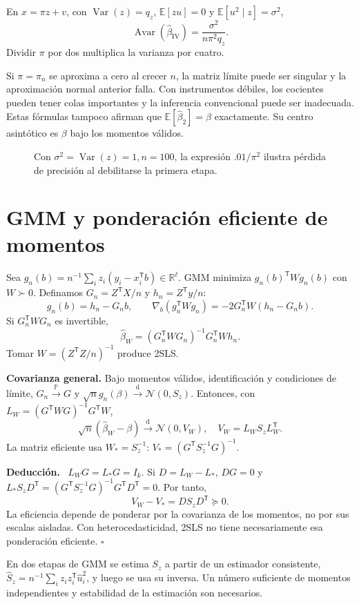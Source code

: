 \documentclass[11pt,a4paper]{article}
\newcommand{\R}{\mathbb R}
\newcommand{\E}{\mathbb E}
\newcommand{\Prob}{\mathbb P}
\newcommand{\T}{^{\mathsf T}}
\DeclareMathOperator{\Var}{Var}
\newcommand{\pto}{\xrightarrow{\Prob}}
\newcommand{\dto}{\xrightarrow{\mathrm d}}
\newcommand{\Normal}{\mathcal N}
\newcommand{\topic}[2]{\clearpage\section{#1}\label{#2}}
\newenvironment{deduccion}{\par\textbf{Deducción.}\ }{\hfill$\square$\par}
\theoremstyle{definition}\newtheorem{definicion}[teorema]{Definición}
\begin{document}
\begin{ejemplo}
En $x=\pi z+v$, con $\Var(z)=q_z$, $\E[zu]=0$ y
$\E[u^2\mid z]=\sigma^2$,
\[
\operatorname{Avar}(\widehat\beta_{\mathrm{IV}})
=\frac{\sigma^2}{n\pi^2q_z}.
\]
Dividir $\pi$ por dos multiplica la varianza por cuatro.
\end{ejemplo}
\begin{cuidado}
Si $\pi=\pi_n$ se aproxima a cero al crecer $n$, la matriz límite puede
ser singular y la aproximación normal anterior falla.
Con instrumentos débiles, los cocientes pueden tener colas importantes
y la inferencia convencional puede ser inadecuada.
Estas fórmulas tampoco afirman que $\E[\widehat\beta_2]=\beta$
exactamente. Su centro asintótico es $\beta$ bajo los momentos válidos.
\end{cuidado}

\begin{figure}[H]\centering
{}
\caption{Con $\sigma^2=\Var(z)=1,n=100$, la expresión $.01/\pi^2$ ilustra pérdida de precisión al debilitarse la primera etapa.}
\end{figure}
\topic{GMM y ponderación eficiente de momentos}{s47}
Sea $g_n(b)=n^{-1}\sum_i z_i(y_i-x_i\T b)\in\R^\ell$.
GMM minimiza $g_n(b)\T Wg_n(b)$ con $W\succ0$.
Definamos $G_n=Z\T X/n$ y $h_n=Z\T y/n$:
\[
g_n(b)=h_n-G_nb,\qquad
\nabla_b(g_n\T Wg_n)=-2G_n\T W(h_n-G_nb).
\]
Si $G_n\T WG_n$ es invertible,
\[
\boxed{\widehat\beta_W=(G_n\T WG_n)^{-1}G_n\T Wh_n}.
\]
Tomar $W=(Z\T Z/n)^{-1}$ produce 2SLS.

\textbf{Covarianza general.}
Bajo momentos válidos, identificación y condiciones de límite,
$G_n\pto G$ y $\sqrt n g_n(\beta)\dto\Normal(0,S_z)$.
Entonces, con $L_W=(G\T WG)^{-1}G\T W$,
\[
\sqrt n(\widehat\beta_W-\beta)\dto\Normal(0,V_W),
\quad
\boxed{V_W=L_WS_zL_W\T}.
\]
La matriz eficiente usa $W_*=S_z^{-1}$:
$V_*=(G\T S_z^{-1}G)^{-1}$.

\begin{deduccion}
$L_WG=L_*G=I_k$. Si $D=L_W-L_*$, $DG=0$ y
$L_*S_zD\T=(G\T S_z^{-1}G)^{-1}G\T D\T=0$.
Por tanto,
\[
V_W-V_*=DS_zD\T\succeq0.
\]
La eficiencia depende de ponderar por la covarianza de los momentos,
no por sus escalas aisladas. Con heterocedasticidad, 2SLS no tiene
necesariamente esa ponderación eficiente.
\end{deduccion}
En dos etapas de GMM se estima $S_z$ a partir de un estimador consistente,
$\widehat S_z=n^{-1}\sum_i z_iz_i\T\widehat u_i^2$,
y luego se usa su inversa. Un número suficiente de momentos independientes
y estabilidad de la estimación son necesarios.
\end{document}
